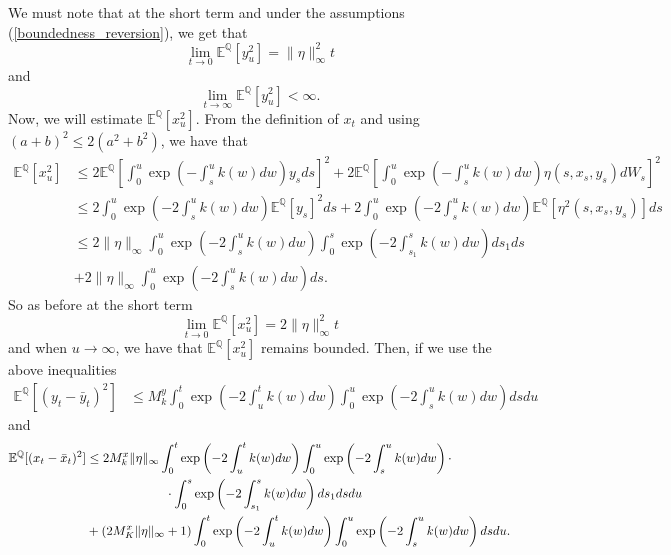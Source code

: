 \documentclass[a4paper,10pt]{article}
\newcommand{\1}{\mathbf{1}}
\begin{document}
We must note that at the short term and under the assumptions (\ref{boundedness_reversion}), we get that
\begin{equation*}
\lim_{t \to 0} \mathbb{E}^{\mathbb{Q}}[y^{2}_u] = \|\eta\|^{2}_{\infty} t
\end{equation*}
and 
\begin{equation*}
\lim_{t \to \infty} \mathbb{E}^{\mathbb{Q}}[y^{2}_u] < \infty.
\end{equation*}
Now, we will estimate $\mathbb{E}^{\mathbb{Q}}[x^{2}_u]$. From the definition of $x_t$ and using $(a+b)^2 \leq 2(a^{2}+ b^{2})$, we have that
\begin{align*}
\mathbb{E}^{\mathbb{Q}}[x^{2}_u] &\leq 2 \mathbb{E}^{\mathbb{Q}}\left[\int_{0}^{u} \exp\left(- \int_{s}^{u} k(w) dw\right) y_s  ds \right]^{2} +  2 \mathbb{E}^{\mathbb{Q}}\left[\int_{0}^{u} \exp\left(- \int_{s}^{u} k(w) dw\right) \eta(s,x_s,y_s)  dW_s \right]^{2} \nonumber \\
&\leq 2 \int_{0}^{u} \exp\left(- 2\int_{s}^{u} k(w) dw\right) \mathbb{E}^{\mathbb{Q}}\left[y_s\right]^{2} ds + 2 \int_{0}^{u} \exp\left(- 2 \int_{s}^{u} k(w) dw\right) \mathbb{E}^{\mathbb{Q}}\left[\eta^{2}(s,x_s,y_s)\right] ds \\
&\leq 2 \|\eta\|_{\infty} \int_{0}^{u} \exp\left(- 2\int_{s}^{u} k(w) dw\right) \int_{0}^{s}  \exp\left(- 2\int_{s_1}^{s} k(w) dw\right) ds_1 ds\\
&+  2 \|\eta\|_{\infty} \int_{0}^{u} \exp\left(- 2\int_{s}^{u} k(w) dw\right) ds.
\end{align*}
So as before at the short term
$$
\lim_{t \to 0} \mathbb{E}^{\mathbb{Q}}[x^{2}_u] = 2\|\eta\|^{2}_{\infty} t
$$
and when $u \to \infty$, we have that $\mathbb{E}^{\mathbb{Q}}[x^{2}_u]$ remains bounded. Then, if we use the above inequalities 
\begin{align*}
\mathbb{E}^{\mathbb{Q}}[(y_t - \bar{y}_t)^{2}] &\leq M^{y}_k \int_{0}^{t}  \exp\left(- 2\int_{u}^{t} k(w) dw\right)  \int_{0}^{u} \exp\left(- 2\int_{s}^{u} k(w) dw\right) ds du
\end{align*}
and
\begin{align*}
\mathbb{E}^{\mathbb{Q}}[(x_t - \bar{x}_t)^{2}] &\leq 2 M^{x}_k \|\eta\|_{\infty} \int_{0}^{t} \exp\left(- 2\int_{u}^{t} k(w) dw\right)\int_{0}^{u} \exp\left(- 2\int_{s}^{u} k(w) dw\right) \cdot \\
& \qquad \hspace{1.5cm} \cdot \int_{0}^{s}  \exp\left(- 2\int_{s_1}^{s} k(w) dw\right) ds_1 ds du \\
&+ (2 M^{x}_K \|\eta\|_{\infty} + 1) \int_{0}^{t}  \exp\left(- 2\int_{u}^{t} k(w) dw\right)  \int_{0}^{u} \exp\left(- 2\int_{s}^{u} k(w) dw\right) ds du.
\end{align*}
\end{document}
